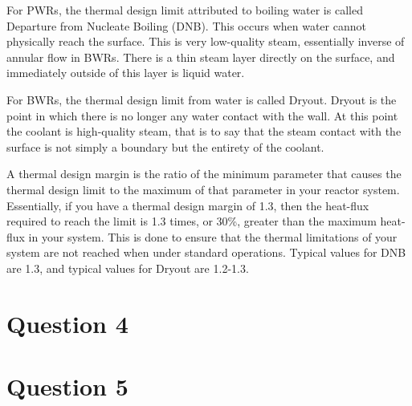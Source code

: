 \documentclass{article}
\begin{document}
For PWRs, the thermal design limit attributed to boiling water is called Departure from Nucleate Boiling (DNB). This occurs when water cannot physically reach the surface. This is very low-quality steam, essentially inverse of annular flow in BWRs. There is a thin steam layer directly on the surface, and immediately outside of this layer is liquid water.

For BWRs, the thermal design limit from water is called Dryout. Dryout is the point in which there is no longer any water contact with the wall. At this point the coolant is high-quality steam, that is to say that the steam contact with the surface is not simply a boundary but the entirety of the coolant. 

A thermal design margin is the ratio of the minimum parameter that causes the thermal design limit to the maximum of that parameter in your reactor system. Essentially, if you have a thermal design margin of 1.3, then the heat-flux required to reach the limit is 1.3 times, or 30\%, greater than the maximum heat-flux in your system. This is done to ensure that the thermal limitations of your system are not reached when under standard operations. Typical values for DNB are 1.3, and typical values for Dryout are 1.2-1.3. 

\section*{Question 4}

\section*{Question 5}
\end{document}
